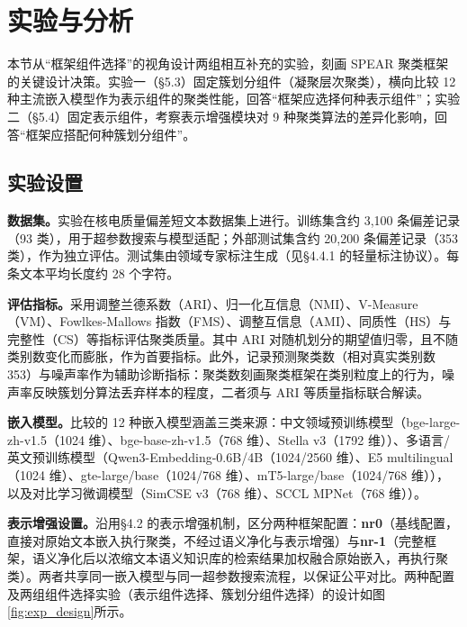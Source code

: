 \documentclass[10.5pt,compsoc,UTF8]{CjC}
\theoremstyle{mystyle}
\begin{document}
\section{\heiti 实验与分析}
\label{sec:experiments}

本节从``框架组件选择''的视角设计两组相互补充的实验，刻画 SPEAR 聚类框架的关键设计决策。实验一（\S 5.3）固定簇划分组件（凝聚层次聚类），横向比较 12 种主流嵌入模型作为表示组件的聚类性能，回答``框架应选择何种表示组件''；实验二（\S 5.4）固定表示组件，考察表示增强模块对 9 种聚类算法的差异化影响，回答``框架应搭配何种簇划分组件''。

{\heiti \subsection{实验设置}}

\textbf{数据集。}实验在核电质量偏差短文本数据集上进行。训练集含约 3,100 条偏差记录（93 类），用于超参数搜索与模型适配；外部测试集含约 20,200 条偏差记录（353 类），作为独立评估。测试集由领域专家标注生成（见\S 4.4.1 的轻量标注协议）。每条文本平均长度约 28 个字符。

\textbf{评估指标。}采用调整兰德系数（ARI）、归一化互信息（NMI）、V-Measure（VM）、Fowlkes-Mallows 指数（FMS）、调整互信息（AMI）、同质性（HS）与完整性（CS）等指标评估聚类质量。其中 ARI 对随机划分的期望值归零，且不随类别数变化而膨胀，作为首要指标。此外，记录预测聚类数（相对真实类别数 353）与噪声率作为辅助诊断指标：聚类数刻画聚类框架在类别粒度上的行为，噪声率反映簇划分算法丢弃样本的程度，二者须与 ARI 等质量指标联合解读。

\textbf{嵌入模型。}比较的 12 种嵌入模型涵盖三类来源：中文领域预训练模型（bge-large-zh-v1.5\cite{xiao2023}（1024 维）、bge-base-zh-v1.5\cite{xiao2023}（768 维）、Stella v3（1792 维））、多语言/英文预训练模型（Qwen3-Embedding-0.6B/4B（1024/2560 维）、E5 multilingual\cite{wang2022}（1024 维）、gte-large/base\cite{li2023}（1024/768 维）、mT5-large/base\cite{xue2021}（1024/768 维）），以及对比学习微调模型（SimCSE v3（768 维）、SCCL MPNet\cite{zhang2021}（768 维））。

\textbf{表示增强设置。}沿用\S 4.2 的表示增强机制，区分两种框架配置：\textbf{nr0}（基线配置，直接对原始文本嵌入执行聚类，不经过语义净化与表示增强）与\textbf{nr-1}（完整框架，语义净化后以浓缩文本语义知识库的检索结果加权融合原始嵌入，再执行聚类）。两者共享同一嵌入模型与同一超参数搜索流程，以保证公平对比。两种配置及两组组件选择实验（表示组件选择、簇划分组件选择）的设计如图\ref{fig:exp_design}所示。
\end{document}

